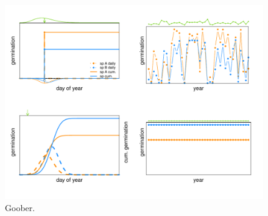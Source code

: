 \documentclass[11pt,letterpaper]{article}
\begin{document}
\begin{figure}[h!]
\centering
\includegraphics[width=1\textwidth]{..//..//..//R/graphs/conceptual/PriorityEff_BetHedge.pdf}
\caption{Goober.}
\label{fig:conceptmodels} 
\end{figure}


\clearpage
\newpage





\end{document}
